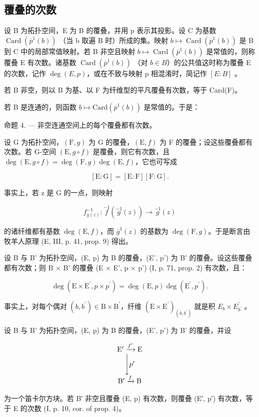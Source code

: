 \subsection{覆叠的次数}

设 B 为拓扑空间，E 为 B 的覆叠，并用 p 表示其投影。设 C 为基数 \(\operatorname{Card}(\overline{p}^{1}(b))\) （当 b 取遍 B 时）所成的集。映射 \(b \mapsto \operatorname{Card}(\overline{p}^{1}(b))\) 是 B 到 C 中的局部常值映射。若 B 非空且映射 \(b \mapsto \operatorname{Card}(\overline{p}^{1}(b))\) 是常值的，则称覆叠 E 有次数。诸基数 \(\operatorname{Card}(\overline{p}^{1}(b))\) （对 \(b \in B\)）的公共值这时称为覆叠 E 的次数，记作 \(\deg(E, p)\)，或在不致与映射 p 相混淆时，简记作 \([E:B]\) 。

若 B 非空，则以 B 为基、以 F 为纤维型的平凡覆叠有次数，等于 Card(F)。

若 B 是连通的，则函数 \(b \mapsto \text{Card}(\overline{p}^{1}(b))\) 是常值的。于是：

命题 4. --- 非空连通空间上的每个覆叠都有次数。

设 G 为拓扑空间，\((\mathrm{F}, g)\) 为 G 的覆叠，\((\mathrm{E}, f)\) 为 F 的覆叠；设这些覆叠都有次数。若 G-空间 \((\mathrm{E}, g \circ f)\) 是覆叠，则它有次数，且 \(\deg(\mathrm{E}, g \circ f) = \deg(\mathrm{F}, g) \deg(\mathrm{E}, f)\)，它也可写成

\[
[ \mathrm{E}: \mathrm{G} ] = [ \mathrm{E}: \mathrm{F} ] [ \mathrm{F}: \mathrm{G} ].
\]

事实上，若 z 是 G 的一点，则映射

\[
f _ {g (z)} ^ {- 1}: \stackrel {{- 1}} {{f}} (\stackrel {{- 1}} {{g}} (z)) \to \stackrel {{- 1}} {{g}} (z)
\]

的诸纤维都有基数 \(\deg(\mathrm{E}, f)\)，而 \(\overline{g}^1(z)\) 的基数为 \(\deg(\mathrm{F}, g)\)。于是断言由牧羊人原理 (E, III, p. 41, prop. 9) 得出。

设 B 与 B' 为拓扑空间，(E, p) 为 B 的覆叠，(E', p') 为 B' 的覆叠。设这些覆叠都有次数；则 B × B' 的覆叠 (E × E', p × p') (I, p. 71, prop. 2) 有次数，且：

\[
\deg (\mathrm{E} \times \mathrm{E} ^ {\prime}, p \times p ^ {\prime}) = \deg (\mathrm{E}, p) \deg (\mathrm{E} ^ {\prime}, p ^ {\prime}).
\]

事实上，对每个偶对 \((b,b^{\prime})\in\mathrm{B}\times\mathrm{B}^{\prime}\)，纤维 \((\mathrm{E}\times\mathrm{E}^{\prime})_{(b,b^{\prime})}\) 就是积 \(E_{b}\times E_{b^{\prime}}^{\prime}\) 。

设 B 与 B' 为拓扑空间，(E, p) 为 B 的覆叠，(E', p') 为 B' 的覆叠，并设

\[
\begin{array}{c} \mathrm{E} ^ {\prime} \xrightarrow {f ^ {\prime}} \mathrm{E} \\ \Biggl \downarrow p ^ {\prime} \\ \mathrm{B} ^ {\prime} \xrightarrow {f} \mathrm{B} \end{array}
\]

为一个笛卡尔方块。若 B′ 非空且覆叠 (E, p) 有次数，则覆叠 (E′, p′) 有次数，等于 E 的次数 (I, p. 10, cor. of prop. 4)。

